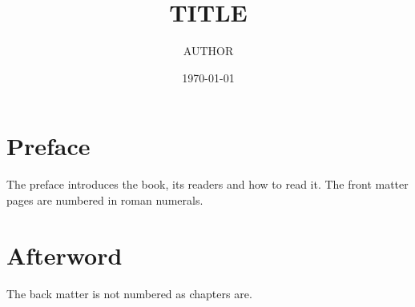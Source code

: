 \documentclass[11pt]{book}
\title{{{TITLE}}}
\author{{{AUTHOR}}}
\date{\today}
\begin{document}
\frontmatter
\maketitle

\chapter*{Preface}

The preface introduces the book, its readers and how to read it. The front
matter pages are numbered in roman numerals.

\tableofcontents

\mainmatter



\backmatter
\chapter*{Afterword}

The back matter is not numbered as chapters are.
\end{document}
